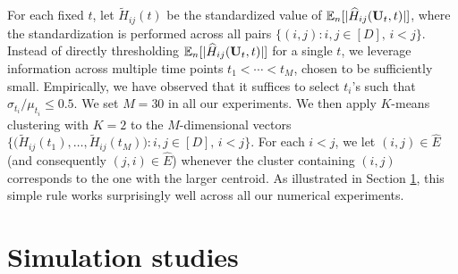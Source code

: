 \documentclass[11pt,a4paper,final]{article}
\numberwithin{equation}{section}
\theoremstyle{remark}
\newcommand{\bU}{{\bf U}}
\newcommand{\bbE}{{\mathbb E}}
\newcommand{\bean}{\setlength\arraycolsep{1pt}\begin{eqnarray*}}
\newcommand{\eean}{\end{eqnarray*}}
\begin{document}
For each fixed $t$, let $\widetilde H_{ij}(t)$ be the standardized value of $\bbE_n[|\widehat H_{ij}(\bU_{t}, t)|]$, where the standardization is performed across all pairs $\{ (i,j) : i,j \in [D], \, i < j \}$. Instead of directly thresholding $\bbE_n[|\widehat H_{ij}(\bU_{t}, t)|]$ for a single $t$, we leverage information across multiple time points $t_1 < \cdots < t_M$, chosen to be sufficiently small. Empirically, we have observed that it suffices to select $t_i$'s such that $\sigma_{t_i} / \mu_{t_i} \leq 0.5$. We set $M=30$ in all our experiments. We then apply $K$-means clustering with $K = 2$ to the $M$-dimensional vectors
$
\{ \big(\widetilde H_{ij}(t_1), \ldots, \widetilde H_{ij}(t_M)\big) : i, j \in [D], \, i < j \}.
$
For each $i < j$, we let $(i, j) \in \widehat E$ (and consequently $(j, i) \in \widehat E$) whenever the cluster containing $(i, j)$ corresponds to the one with the larger centroid. As illustrated in Section \ref{sec:simulation}, this simple rule works surprisingly well across all our numerical experiments.








\section{Simulation studies} \label{sec:simulation}
\end{document}
